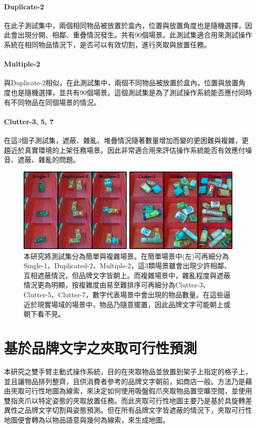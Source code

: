 \paragraph{Duplicate-2}
在此子測試集中，兩個相同物品被放置於盒內，位置與放置角度也是隨機選擇，因此會出現分開、相鄰、重疊情況發生。共有90個場景。此測試集適合用來測試操作系統在相同物品情況下，是否可以有效切割，進行夾取與放置任務。

\paragraph{Multiple-2}
與Duplicate-2相似，在此測試集中，兩個不同物品被放置於盒內，位置與放置角度也是隨機選擇，並共有90個場景。這個測試集是為了測試操作系統能否應付同時有不同物品在同個場景的情況。

\paragraph{Clutter-3, 5, 7}
在這3個子測試集，遮蔽、雜亂、堆疊情況隨著數量增加而變的更困難與複雜，更趨近於真實環境的上架任務場景。因此非常適合用來評估操作系統能否有效應付噪音、遮蔽、雜亂的問題。


\begin{figure}[htb]
	\centering
	\includegraphics[height=!, width=1.0\linewidth, keepaspectratio=true]
	{./figures/testset.jpg}
  \caption{本研究將測試集分為簡單與複雜場景。在簡單場景中(左)可再細分為Single-1、Duplicated-2、Multiple-2，這3類場景雖會出現少許相鄰、互相遮蔽情況，但品牌文字皆朝上。而複雜場景中，雜亂程度與遮蔽情況更為明顯，按複雜度由易至難排序可再細分為Clutter-3、Clutter-5、Clutter-7，數字代表場景中會出現的物品數量。在這些逼近於現實場域的場景中，物品乃隨意擺置，因此品牌文字可能朝上或朝下看不見。}
  \label{figure:testset}
\end{figure}


\section{基於品牌文字之夾取可行性預測}
本研究之雙手臂主動式操作系統，目的在夾取物品並放置到架子上指定的格子上，並且讓物品排列整齊，且供消費者參考的品牌文字朝前，如商店一般。方法乃是藉由夾取可行性地圖為線索，來決定如何使用吸盤假爪夾取物品置空曠空間，並使用雙指夾爪以特定姿態的夾取放置任務。而此夾取可行性地圖主要乃是基於具旋轉差異性之品牌文字切割與姿態預測。但在所有品牌文字皆遮蔽的情況下，夾取可行性地圖便會轉為以物品語意與幾何為線索，來生成地圖。

